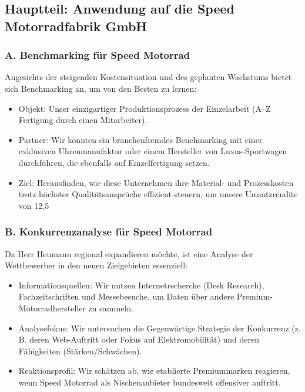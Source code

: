 \documentclass[12pt, a4paper]{article}
\begin{document}
\subsection{Hauptteil: Anwendung auf die Speed Motorradfabrik GmbH}
\subsubsection{A. Benchmarking für Speed Motorrad}
Angesichts der steigenden Kostensituation und des geplanten Wachstums bietet sich Benchmarking an, um von den Besten zu lernen:
\begin{itemize}
    \item Objekt: Unser einzigartiger Produktionsprozess der Einzelarbeit (A–Z Fertigung durch einen Mitarbeiter).
    \item Partner: Wir könnten ein branchenfremdes Benchmarking mit einer exklusiven Uhrenmanufaktur oder einem Hersteller von Luxus-Sportwagen durchführen, die ebenfalls auf Einzelfertigung setzen.
    \item Ziel: Herausfinden, wie diese Unternehmen ihre Material- und Prozesskosten trotz höchster Qualitätsansprüche effizient steuern, um unsere Umsatzrendite von 12,5 %
\end{itemize}

\subsubsection{B. Konkurrenzanalyse für Speed Motorrad}
Da Herr Heumann regional expandieren möchte, ist eine Analyse der Wettbewerber in den neuen Zielgebieten essenziell:
\begin{itemize}
    \item Informationsquellen: Wir nutzen Internetrecherche (Desk Research), Fachzeitschriften und Messebesuche, um Daten über andere Premium-Motorradhersteller zu sammeln.
    \item Analysefokus: Wir untersuchen die Gegenwärtige Strategie der Konkurrenz (z. B. deren Web-Auftritt oder Fokus auf Elektromobilität) und deren Fähigkeiten (Stärken/Schwächen).
    \item Reaktionsprofil: Wir schätzen ab, wie etablierte Premiummarken reagieren, wenn Speed Motorrad als Nischenanbieter bundesweit offensiver auftritt.
\end{itemize}
\end{document}
